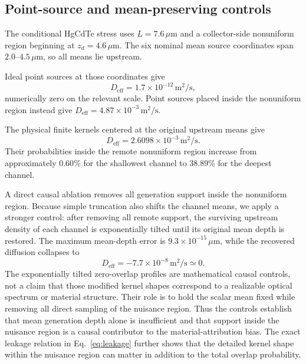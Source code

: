 \documentclass[aps,pra,twocolumn,superscriptaddress,nofootinbib]{revtex4-2}
\newcommand{\Deff}{D_{\mathrm{eff}}}
\begin{document}
\subsection{Point-source and mean-preserving controls}

The conditional HgCdTe stress uses $L=7.6\,\mu\mathrm{m}$ and a collector-side nonuniform region beginning at $z_d=4.6\,\mu\mathrm{m}$. The six nominal mean source coordinates span $2.0$--$4.5\,\mu\mathrm{m}$, so all means lie upstream.

Ideal point sources at those coordinates give
\begin{equation}
\Deff=1.7\times10^{-12}\,\mathrm{m^2/s},
\end{equation}
numerically zero on the relevant scale. Point sources placed inside the nonuniform region instead give $\Deff=4.87\times10^{-3}\,\mathrm{m^2/s}$.

The physical finite kernels centered at the original upstream means give
\begin{equation}
\Deff=2.6098\times10^{-3}\,\mathrm{m^2/s}.
\label{eq:hgcdteD}
\end{equation}
Their probabilities inside the remote nonuniform region increase from approximately $0.60\%$ for the shallowest channel to $38.89\%$ for the deepest channel.

A direct causal ablation removes all generation support inside the nonuniform region. Because simple truncation also shifts the channel means, we apply a stronger control: after removing all remote support, the surviving upstream density of each channel is exponentially tilted until its original mean depth is restored. The maximum mean-depth error is $9.3\times10^{-15}\,\mu\mathrm{m}$, while the recovered diffusion collapses to
\begin{equation}
\Deff=-7.7\times10^{-8}\,\mathrm{m^2/s}\simeq0.
\end{equation}
The exponentially tilted zero-overlap profiles are mathematical causal controls, not a claim that those modified kernel shapes correspond to a realizable optical spectrum or material structure.  Their role is to hold the scalar mean fixed while removing all direct sampling of the nuisance region.
Thus the controls establish that mean generation depth alone is insufficient and that support inside the nuisance region is a causal contributor to the material-attribution bias.  The exact leakage relation in Eq.~\eqref{eq:leakage} further shows that the detailed kernel shape within the nuisance region can matter in addition to the total overlap probability.
\end{document}
